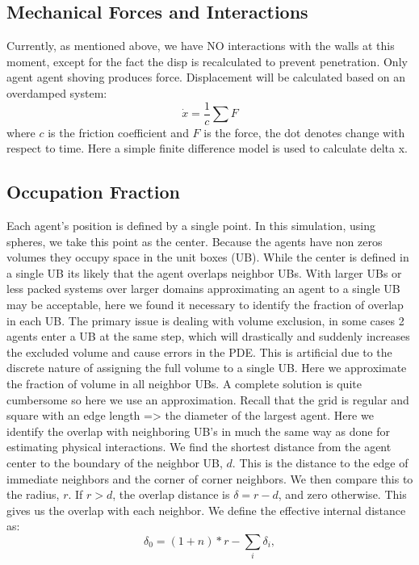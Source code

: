 \documentclass{article}
\begin{document}
\subsection{Mechanical Forces and Interactions}
Currently, as mentioned above, 
we have NO interactions with the walls at this moment,
except for the fact the disp is recalculated to prevent penetration.
Only agent agent shoving produces force.
Displacement will be calculated based on an overdamped system:
\begin{equation}
\dot{x} = \frac{1}{c} \sum F
\label{EQ:disp}
\end{equation}
where $c$ is the friction coefficient and $F$ is the force, the dot denotes change with respect to time.
Here a simple finite difference model is used to calculate delta x.

\subsection{Occupation Fraction}
Each agent's position is defined by a single point.  
In this simulation, using spheres, we take this point as the center.
Because the agents have non zeros volumes they occupy space in the unit boxes (UB).
While the center is defined in a single UB its likely that the agent overlaps neighbor UBs.
With larger UBs or less packed systems over larger domains approximating an agent to a single UB may be acceptable,
here we found it necessary to identify the fraction of overlap in each UB.
The primary issue is dealing with volume exclusion,
in some cases 2 agents enter a UB at the same step, 
which will drastically and suddenly increases the excluded volume and cause errors in the PDE.
This is artificial due to the discrete nature of assigning the full volume to a single UB.
Here we approximate the fraction of volume in all neighbor UBs.
A complete solution is quite cumbersome so here we use an approximation.
Recall that the grid is regular and square with an edge length => the diameter of the largest agent.
Here we identify the overlap with neighboring UB's in much the same way as done for estimating physical interactions.
We find the shortest distance from the agent center to the boundary of the neighbor UB, $d$.
This is the distance to the edge of immediate neighbors and the corner of corner neighbors.
We then compare this to the radius, $r$.
If $r>d$, the overlap distance is $\delta = r-d$, and zero otherwise.
This gives us the overlap with each neighbor.  
We define the effective internal distance as:
\begin{equation}
\delta_0 = (1+n)*r - \sum_i \delta_i,
\end{equation}
\end{document}
